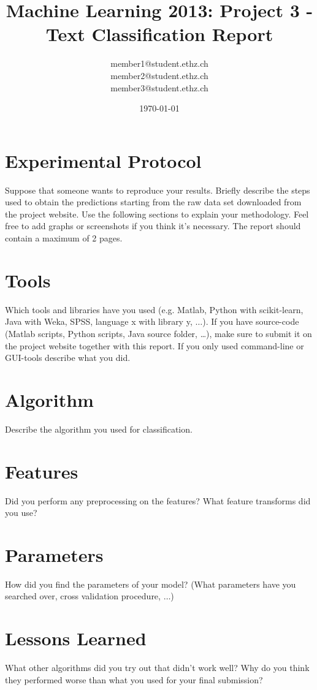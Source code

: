\documentclass[a4paper, 11pt]{article}
\title{Machine Learning 2013: Project 3 - Text Classification Report}
\author{member1@student.ethz.ch\\ member2@student.ethz.ch\\ member3@student.ethz.ch\\}
\date{\today}
\begin{document}
\maketitle

\section*{Experimental Protocol}
Suppose that someone wants to reproduce your results. Briefly describe the steps used to obtain the
predictions starting from the raw data set downloaded from the project website. Use the following
sections to explain your methodology. Feel free to add graphs or screenshots if you think it's
necessary. The report should contain a maximum of 2 pages.

\section{Tools}
Which tools and libraries have you used (e.g. Matlab, Python with scikit-learn, Java with Weka,
SPSS, language x with library y, $\ldots$). If you have source-code (Matlab scripts, Python scripts, Java source folder, \dots),
make sure to submit it on the project website together with this report. If you only used
command-line or GUI-tools describe what you did.

\section{Algorithm}
Describe the algorithm you used for classification.

\section{Features}
Did you perform any preprocessing on the features? What feature transforms did you use?

\section{Parameters}
How did you find the parameters of your model? (What parameters have you searched over, cross validation procedure, $\ldots$)

\section{Lessons Learned} What other algorithms did you try out that didn't work well?
Why do you think they performed worse than what you used for your final submission?
\end{document}
